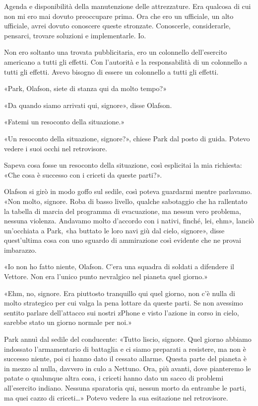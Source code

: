 Agenda e disponibilità della manutenzione delle attrezzature. Era
qualcosa di cui non mi ero mai dovuto preoccupare prima. Ora che ero un
ufficiale, un alto ufficiale, avrei dovuto conoscere queste stronzate.
Conoscerle, considerarle, pensarci, trovare soluzioni e implementarle.
Io.

Non ero soltanto una trovata pubblicitaria, ero un colonnello
dell'esercito americano a tutti gli effetti. Con l'autorità e la
responsabilità di un colonnello a tutti gli effetti. Avevo bisogno di
essere un colonnello a tutti gli effetti.

«Park, Olafson, siete di stanza qui da molto tempo?»

«Da quando siamo arrivati qui, signore», disse Olafson.

«Fatemi un resoconto della situazione.»

«Un resoconto della situazione, signore?», chiese Park dal posto di
guida. Potevo vedere i suoi occhi nel retrovisore.

Sapeva cosa fosse un resoconto della situazione, così esplicitai la mia
richiesta: «Che cosa è successo con i criceti da queste parti?».

Olafson si girò in modo goffo sul sedile, così poteva guardarmi mentre
parlavamo. «Non molto, signore. Roba di basso livello, qualche
sabotaggio che ha rallentato la tabella di marcia del programma di
evacuazione, ma nessun vero problema, nessuna violenza. Andavamo molto
d'accordo con i nativi, finché, lei, ehm», lanciò un'occhiata a Park,
«ha buttato le loro navi giù dal cielo, signore», disse quest'ultima
cosa con uno sguardo di ammirazione così evidente che ne provai
imbarazzo.

«Io non ho fatto niente, Olafson. C'era una squadra di soldati a
difendere il Vettore. Non era l'unico punto nevralgico nel pianeta quel
giorno.»

«Ehm, no, signore. Era piuttosto tranquillo qui quel giorno, non c'è
nulla di molto strategico per cui valga la pena lottare da queste parti.
Se non avessimo sentito parlare dell'attacco sui nostri zPhone e visto
l'azione in corso in cielo, sarebbe stato un giorno normale per noi.»

Park annuì dal sedile del conducente: «Tutto liscio, signore. Quel
giorno abbiamo indossato l'armamentario di battaglia e ci siamo
preparati a resistere, ma non è successo niente, poi ci hanno dato il
cessato allarme. Questa parte del pianeta è in mezzo al nulla, davvero
in culo a Nettuno. Ora, più avanti, dove pianteremo le patate o
qualunque altra cosa, i criceti hanno dato un sacco di problemi
all'esercito indiano. Nessuna sparatoria qui, nessun morto da entrambe
le parti, ma quei cazzo di criceti\ldots» Potevo vedere la sua
esitazione nel retrovisore.

